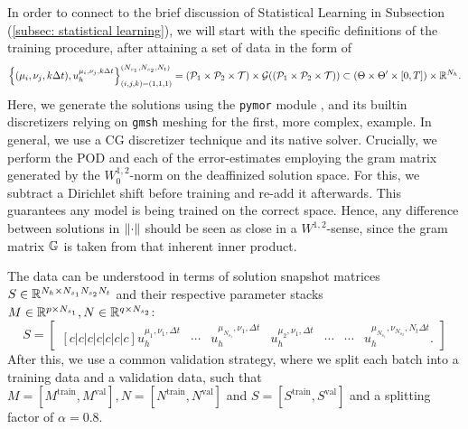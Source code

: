 In order to connect to the brief discussion of Statistical Learning in Subsection (\ref{subsec: statistical learning}),
we will start with the specific definitions of the training procedure, after attaining a set of data in
the form of
\begin{equation*}
    \left\{ (\mu_i, \nu_j, k \Delta t), 
    u_h^{\mu_i, \nu_j, k \Delta t}\right\}_{(i,j,k) = (1, 1, 1)}^{(N_{s_1}, N_{s_2}, N_t)} 
    = (\mathcal{P}_1 \times \mathcal{P}_2 \times \mathcal{T}) \times \mathcal{G}((\mathcal{P}_1 \times \mathcal{P}_2 \times \mathcal{T})) \subset
    (\Theta \times \Theta' \times [0, T]) \times \mathbb{R}^{N_h}.
\end{equation*}
Here, we generate the solutions using the \texttt{pymor} module \cite{pymor2016}, and its builtin discretizers relying
on \texttt{gmsh} meshing for the first, more complex, example. In general, we use a CG discretizer technique
and its native solver. Crucially, 
we perform the POD and each of the error-estimates employing the gram matrix generated by
the $W^{1, 2}_0$-norm on the deaffinized solution space. For this, we subtract a 
Dirichlet shift before training and re-add it afterwards. This guarantees any model is being trained
on the correct space. Hence, any difference between solutions in $\lVert \cdot \rVert$ should be seen
as close in a $W^{1, 2}$-sense, since the gram matrix $\mathbb{G}$ is taken from that
inherent inner product. 

The data can be understood 
in terms of solution snapshot matrices $S \in \mathbb{R}^{N_h \times N_{s_1}N_{s_2}N_t}$ and their respective parameter stacks 
$M \in \mathbb{R}^{p \times N_{s_1}}, N \in
\mathbb{R}^{q \times N_{s_2}}$:
\begin{equation*}
    S = \begin{bmatrix}[c|c|c|c|c|c|c]
        u_h^{\mu_1, \nu_1, \Delta t} & \cdots & u_h^{\mu_{N_{s_1}}, \nu_1, \Delta t} & u_h^{\mu_2, \nu_1, \Delta t}
        & \cdots & \cdots & u_h^{\mu_{N_{s_1}}, \nu_{N_{s_2}}, N_t \Delta t}.
    \end{bmatrix}
\end{equation*}
After this, we use a common validation strategy, where we split each batch into a training data
and a validation data, such that $M = [M^\text{train}, M^\text{val}], 
N = [N^\text{train}, N^\text{val}]$ and $S = [S^\text{train}, S^\text{val}]$ and a splitting factor of $\alpha=0.8$.

